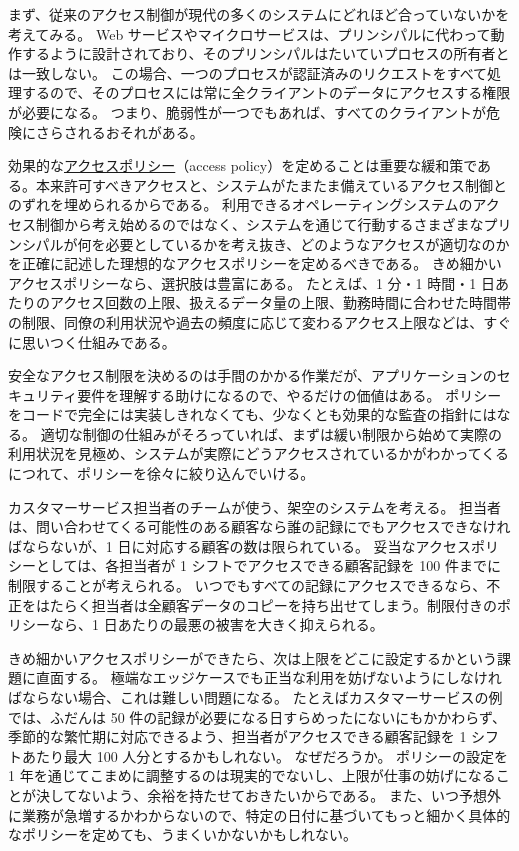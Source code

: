 \documentclass[uplatex]{jsarticle}
\def\label#1{}%
\begin{document}
まず、従来のアクセス制御が現代の多くのシステムにどれほど合っていないかを考えてみる。
Web サービスやマイクロサービスは、プリンシパルに代わって動作するように設計されており、そのプリンシパルはたいていプロセスの所有者とは一致しない。
この場合、一つのプロセスが認証済みのリクエストをすべて処理するので、そのプロセスには常に全クライアントのデータにアクセスする権限が必要になる。
つまり、脆弱性が一つでもあれば、すべてのクライアントが危険にさらされるおそれがある。

効果的な\underline{アクセスポリシー}（access policy）を定めることは重要な緩和策である。本来許可すべきアクセスと、システムがたまたま備えているアクセス制御とのずれを埋められるからである。
利用できるオペレーティングシステムのアクセス制御から考え始めるのではなく、システムを通じて行動するさまざまなプリンシパルが何を必要としているかを考え抜き、どのようなアクセスが適切なのかを正確に記述した理想的なアクセスポリシーを定めるべきである。
きめ細かいアクセスポリシーなら、選択肢は豊富にある。
たとえば、1 分・1 時間・1 日あたりのアクセス回数の上限、扱えるデータ量の上限、勤務時間に合わせた時間帯の制限、同僚の利用状況や過去の頻度に応じて変わるアクセス上限などは、すぐに思いつく仕組みである。

安全なアクセス制限を決めるのは手間のかかる作業だが、アプリケーションのセキュリティ要件を理解する助けになるので、やるだけの価値はある。
ポリシーをコードで完全には実装しきれなくても、少なくとも効果的な監査の指針にはなる。
適切な制御の仕組みがそろっていれば、まずは緩い制限から始めて実際の利用状況を見極め、システムが実際にどうアクセスされているかがわかってくるにつれて、ポリシーを徐々に絞り込んでいける。

\begin{exa}[カスタマーサービス担当者のアクセス上限]\label{exa:ch3-customer-service}
カスタマーサービス担当者のチームが使う、架空のシステムを考える。
担当者は、問い合わせてくる可能性のある顧客なら誰の記録にでもアクセスできなければならないが、1 日に対応する顧客の数は限られている。
妥当なアクセスポリシーとしては、各担当者が 1 シフトでアクセスできる顧客記録を 100 件までに制限することが考えられる。
いつでもすべての記録にアクセスできるなら、不正をはたらく担当者は全顧客データのコピーを持ち出せてしまう。制限付きのポリシーなら、1 日あたりの最悪の被害を大きく抑えられる。
\end{exa}

きめ細かいアクセスポリシーができたら、次は上限をどこに設定するかという課題に直面する。
極端なエッジケースでも正当な利用を妨げないようにしなければならない場合、これは難しい問題になる。
たとえばカスタマーサービスの例では、ふだんは 50 件の記録が必要になる日すらめったにないにもかかわらず、季節的な繁忙期に対応できるよう、担当者がアクセスできる顧客記録を 1 シフトあたり最大 100 人分とするかもしれない。
なぜだろうか。
ポリシーの設定を 1 年を通じてこまめに調整するのは現実的でないし、上限が仕事の妨げになることが決してないよう、余裕を持たせておきたいからである。
また、いつ予想外に業務が急増するかわからないので、特定の日付に基づいてもっと細かく具体的なポリシーを定めても、うまくいかないかもしれない。
\end{document}
